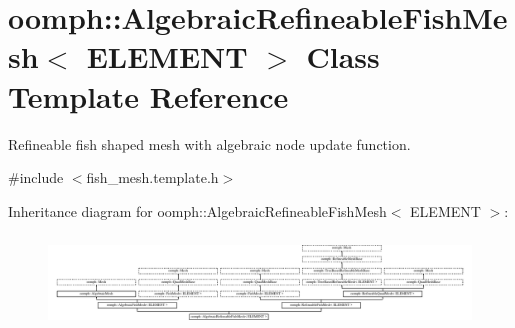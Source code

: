 \hypertarget{classoomph_1_1AlgebraicRefineableFishMesh}{}\section{oomph\+:\+:Algebraic\+Refineable\+Fish\+Mesh$<$ E\+L\+E\+M\+E\+NT $>$ Class Template Reference}
\label{classoomph_1_1AlgebraicRefineableFishMesh}


Refineable fish shaped mesh with algebraic node update function.  




{\ttfamily \#include $<$fish\+\_\+mesh.\+template.\+h$>$}

Inheritance diagram for oomph\+:\+:Algebraic\+Refineable\+Fish\+Mesh$<$ E\+L\+E\+M\+E\+NT $>$\+:\begin{figure}[H]
\begin{center}
\leavevmode
\includegraphics[height=2.488889cm]{classoomph_1_1AlgebraicRefineableFishMesh}
\end{center}
\end{figure}
